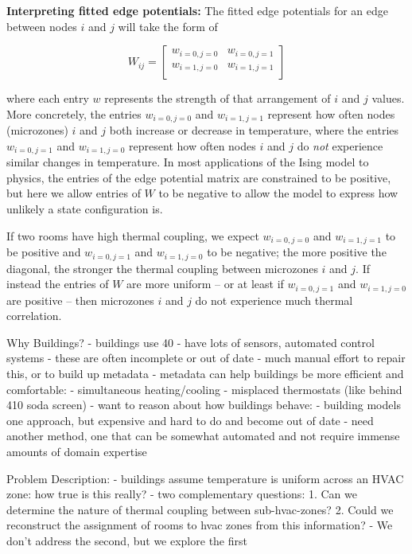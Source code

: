 \textbf{Interpreting fitted edge potentials:} The fitted edge potentials for an edge between nodes $i$ and $j$ will take the form of

\begin{equation}\label{eq:W}
W_{ij} =
\begin{bmatrix}
w_{i=0,j=0} & w_{i=0,j=1} \\
w_{i=1,j=0} & w_{i=1,j=1} \\
\end{bmatrix}
\end{equation}

where each entry $w$ represents the strength of that arrangement of $i$ and $j$ values.
More concretely, the entries $w_{i=0,j=0}$ and $w_{i=1,j=1}$ represent how often nodes (microzones) $i$ and $j$ both increase or decrease in temperature, where the entries $w_{i=0,j=1}$ and $w_{i=1,j=0}$ represent how often nodes $i$ and $j$ do \emph{not} experience similar changes in temperature.
In most applications of the Ising model to physics, the entries of the edge potential matrix are constrained to be positive, but here we allow entries of $W$ to be negative to allow the model to express how unlikely a state configuration is.

If two rooms have high thermal coupling, we expect $w_{i=0,j=0}$ and $w_{i=1,j=1}$ to be positive and $w_{i=0,j=1}$ and $w_{i=1,j=0}$ to be negative; the more positive the diagonal, the stronger the thermal coupling between microzones $i$ and $j$.
If instead the entries of $W$ are more uniform -- or at least if $w_{i=0,j=1}$ and $w_{i=1,j=0}$ are positive -- then microzones $i$ and $j$ do not experience much thermal correlation.

Why Buildings?
- buildings use 40%
    - have lots of sensors, automated control systems
    - these are often incomplete or out of date
    - much manual effort to repair this, or to build up metadata
    - metadata can help buildings be more efficient and comfortable:
        - simultaneous heating/cooling
        - misplaced thermostats (like behind 410 soda screen)
    - want to reason about how buildings behave:
      - building models one approach, but expensive and hard to do and become out of date
      - need another method, one that can be somewhat automated and not require
        immense amounts of domain expertise

Problem Description:
- buildings assume temperature is uniform across an HVAC zone: how true is this really?
    - two complementary questions:
      1. Can we determine the nature of thermal coupling between sub-hvac-zones?
      2. Could we reconstruct the assignment of rooms to hvac zones from this information?
    - We don't address the second, but we explore the first

\fi
